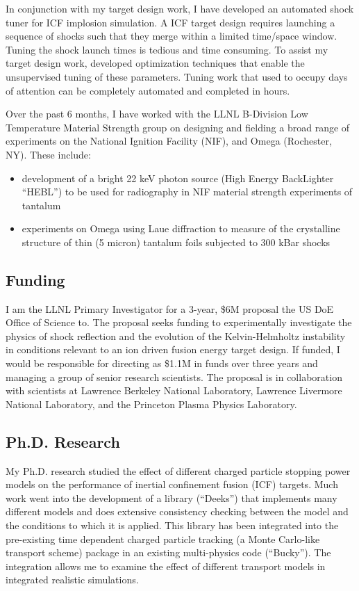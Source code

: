 \documentclass[letterpaper,11pt]{article}
\begin{document}
In conjunction with my target design work, I have developed an automated shock
tuner for ICF implosion simulation.  A ICF target design requires launching a
sequence of shocks such that they merge within a limited time/space window.
Tuning the shock launch times is tedious and time consuming.  To assist my
target design work, developed optimization techniques that enable the
unsupervised tuning of these parameters.  Tuning work that used to occupy days
of attention can be completely automated and completed in hours.

Over the past 6 months, I have worked with the LLNL B-Division Low Temperature
Material Strength group on designing and fielding a broad range of experiments
on the National Ignition Facility (NIF), and Omega (Rochester, NY).  These
include:
\begin{itemize}
	\item development of a bright 22 keV photon source (High Energy BackLighter
		``HEBL'') to be used for radiography in NIF material strength experiments
		of tantalum
	\item experiments on Omega using Laue diffraction to measure of the
		crystalline structure of thin (5 micron) tantalum foils subjected
		to 300 kBar shocks
\end{itemize}


\subsection*{Funding}
I am the LLNL Primary Investigator for a 3-year, \$6M proposal the US DoE
Office of Science to.  The proposal seeks funding to  experimentally investigate
the physics of shock reflection and the evolution of the Kelvin-Helmholtz
instability in conditions relevant to an ion driven fusion energy target
design.  If funded, I would be responsible for directing as \$1.1M in funds
over three years and managing a group of senior research scientists.  The
proposal is in collaboration with scientists at Lawrence Berkeley National
Laboratory, Lawrence Livermore National Laboratory, and the Princeton Plasma
Physics Laboratory.


\subsection*{Ph.D. Research}
My Ph.D. research studied the effect of different charged particle stopping
power models on the performance of inertial confinement fusion (ICF) targets.
Much work went into the development of a library (``Deeks'') that implements
many different models and does extensive consistency checking between the model
and the conditions to which it is applied.  This library has been integrated
into the pre-existing time dependent charged particle tracking (a Monte
Carlo-like transport scheme) package in an existing multi-physics code
(``Bucky'').  The integration allows me to examine the effect of different
transport models in integrated realistic simulations.
\end{document}
